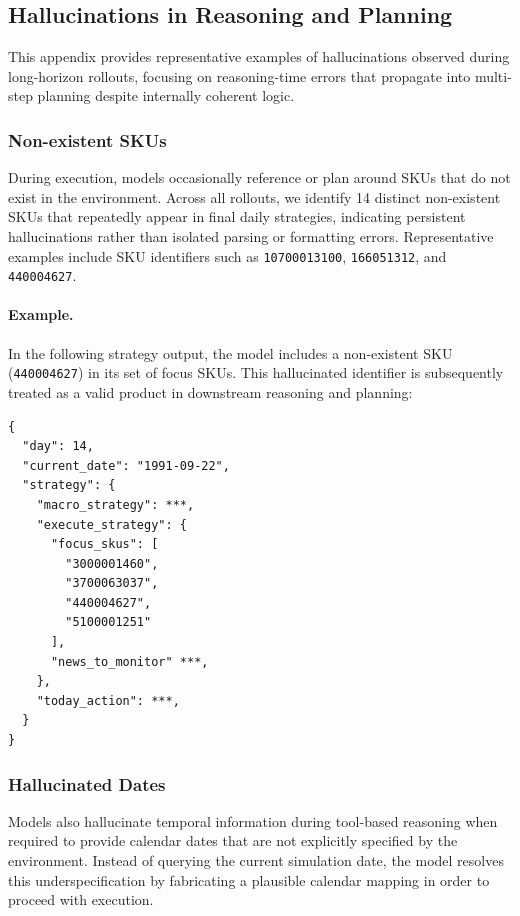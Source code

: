 \subsection{Hallucinations in Reasoning and Planning}
\label{appendix:hallucinations}

This appendix provides representative examples of hallucinations observed during long-horizon rollouts, focusing on reasoning-time errors that propagate into multi-step planning despite internally coherent logic.

\subsubsection{Non-existent SKUs}

During execution, models occasionally reference or plan around SKUs that do not exist in the environment. Across all rollouts, we identify 14 distinct non-existent SKUs that repeatedly appear in final daily strategies, indicating persistent hallucinations rather than isolated parsing or formatting errors. Representative examples include SKU identifiers such as \texttt{10700013100}, \texttt{166051312}, and \texttt{440004627}.

\paragraph{Example.}
In the following strategy output, the model includes a non-existent SKU (\texttt{440004627}) in its set of focus SKUs. This hallucinated identifier is subsequently treated as a valid product in downstream reasoning and planning:
\begin{verbatim}
{
  "day": 14,
  "current_date": "1991-09-22",
  "strategy": {
    "macro_strategy": ***,
    "execute_strategy": {
      "focus_skus": [
        "3000001460",
        "3700063037",
        "440004627",
        "5100001251"
      ],
      "news_to_monitor" ***, 
    },
    "today_action": ***,
  }
}
\end{verbatim}

\subsubsection{Hallucinated Dates}

Models also hallucinate temporal information during tool-based reasoning when required to provide calendar dates that are not explicitly specified by the environment. Instead of querying the current simulation date, the model resolves this underspecification by fabricating a plausible calendar mapping in order to proceed with execution.

